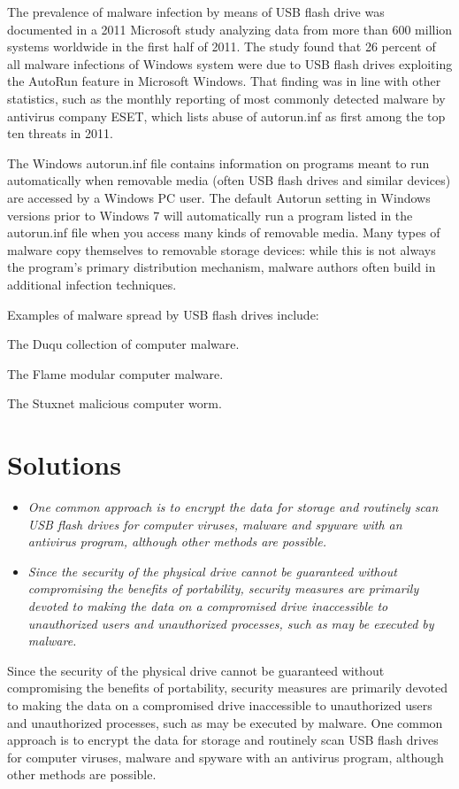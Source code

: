 The prevalence of malware infection by means of USB flash drive was
documented in a 2011 Microsoft study analyzing data from more than 600
million systems worldwide in the first half of 2011. The study found
that 26 percent of all malware infections of Windows system were due to
USB flash drives exploiting the AutoRun feature in Microsoft Windows.
That finding was in line with other statistics, such as the monthly
reporting of most commonly detected malware by antivirus company ESET,
which lists abuse of autorun.inf as first among the top ten threats in
2011.

The Windows autorun.inf file contains information on programs meant to
run automatically when removable media (often USB flash drives and
similar devices) are accessed by a Windows PC user. The default Autorun
setting in Windows versions prior to Windows 7 will automatically run a
program listed in the autorun.inf file when you access many kinds of
removable media. Many types of malware copy themselves to removable
storage devices: while this is not always the program's primary
distribution mechanism, malware authors often build in additional
infection techniques.

Examples of malware spread by USB flash drives include:

The Duqu collection of computer malware.

The Flame modular computer malware.

The Stuxnet malicious computer worm.

\section{Solutions}\label{solutions}

\begin{itemize}
\item
  \emph{One common approach is to encrypt the data for storage and
  routinely scan USB flash drives for computer viruses, malware and
  spyware with an antivirus program, although other methods are
  possible.}
\item
  \emph{Since the security of the physical drive cannot be guaranteed
  without compromising the benefits of portability, security measures
  are primarily devoted to making the data on a compromised drive
  inaccessible to unauthorized users and unauthorized processes, such as
  may be executed by malware.}
\end{itemize}

Since the security of the physical drive cannot be guaranteed without
compromising the benefits of portability, security measures are
primarily devoted to making the data on a compromised drive inaccessible
to unauthorized users and unauthorized processes, such as may be
executed by malware. One common approach is to encrypt the data for
storage and routinely scan USB flash drives for computer viruses,
malware and spyware with an antivirus program, although other methods
are possible.

